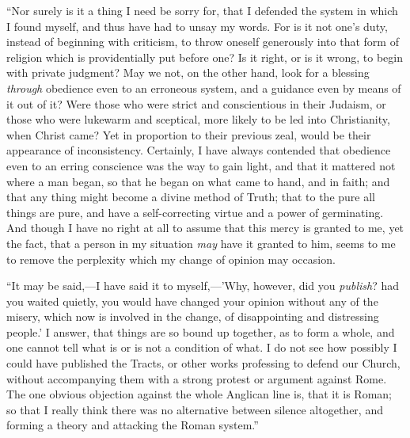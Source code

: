 ``Nor surely is it a thing I need be sorry for, that I defended
the system in which I found myself, and thus have had to unsay my words.
For is it not one's duty, instead of beginning with criticism, to throw
oneself generously into that form of religion which is providentially
put before one? Is it right, or is it wrong, to begin with private
judgment? May we not, on the other hand, look for a blessing \emph{through}
obedience even to an erroneous system, and a guidance even by means of
it out of it? Were those who were strict and conscientious in their
Judaism, or those who were lukewarm and sceptical, more likely to be led
into Christianity, when Christ came? Yet in proportion to their previous
zeal, would be their appearance of inconsistency. Certainly, I have
always contended that obedience even to an erring conscience was
the way to gain light, and that it mattered not where a man began, so
that he began on what came to hand, and in faith; and that any thing
might become a divine method of Truth; that to the pure all things are
pure, and have a self-correcting virtue and a power of germinating. And
though I have no right at all to assume that this mercy is granted to
me, yet the fact, that a person in my situation \emph{may} have it granted to
him, seems to me to remove the perplexity which my change of opinion may
occasion.

``It may be said,—I have said it to myself,—'Why, however,
did you \emph{publish}? had you waited quietly, you would have changed your
opinion without any of the misery, which now is involved in the change,
of disappointing and distressing people.' I answer, that things are so
bound up together, as to form a whole, and one cannot tell what is or is
not a condition of what. I do not see how possibly I could have
published the Tracts, or other works professing to defend our Church,
without accompanying them with a strong protest or argument against
Rome. The one obvious objection against the whole Anglican line is, that
it is Roman; so that I really think there was no alternative between
silence altogether, and forming a theory and attacking the Roman
system.''

